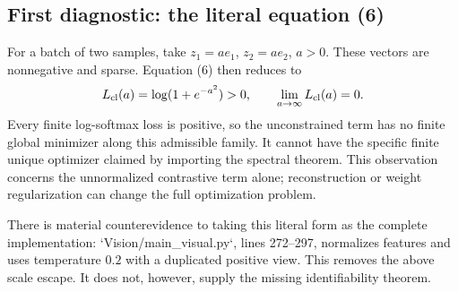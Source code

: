 \documentclass[10pt]{article}
\begin{document}
\subsection*{First diagnostic: the literal equation (6)}
For a batch of two samples, take \(z_1=ae_1\), \(z_2=ae_2\), \(a>0\). These vectors are nonnegative and sparse. Equation (6) then reduces to \[L_{\rm cl}(a)=\log(1+e^{-a^2})>0,\qquad
 \lim_{a\to\infty}L_{\rm cl}(a)=0.\] Every finite log-softmax loss is positive, so the unconstrained term has no finite global minimizer along this admissible family. It cannot have the specific finite unique optimizer claimed by importing the spectral theorem. This observation concerns the unnormalized contrastive term alone; reconstruction or weight regularization can change the full optimization problem.\par
There is material counterevidence to taking this literal form as the complete implementation: `Vision/main\_visual.py`, lines 272–297, normalizes features and uses temperature \(0.2\) with a duplicated positive view. This removes the above scale escape. It does not, however, supply the missing identifiability theorem.\par
\end{document}
